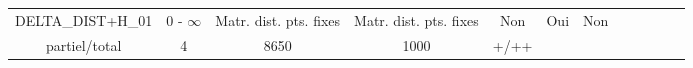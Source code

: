 \documentclass{report}
\begin{document}
\begin{landscape}
\begin{tabular}{|c|c|c|c|c|c|c|c|c|c|c|c|}
\begin{minipage}{3.3cm}\vspace{5mm}DELTA\_DIST+H\_01 \vspace{1mm} \end{minipage} &
\begin{minipage}{1.3cm}0 - $\infty$ \end{minipage} &
\begin{minipage}{1.8cm}Matr. dist. pts. fixes \end{minipage} &
\begin{minipage}{1.8cm}Matr. dist. pts. fixes \end{minipage} &
\begin{minipage}{1.4cm}Non \end{minipage} &
\begin{minipage}{1.4cm}Oui \end{minipage} &
\begin{minipage}{2cm} Non \end{minipage} &
\begin{minipage}{1.8cm}RMSE\\ partiel/total \end{minipage}&
\begin{minipage}{1.65cm} 4 \end{minipage}&
\begin{minipage}{1.2cm} 8650 \end{minipage} &
\begin{minipage}{1cm}1000 \end{minipage} &
\begin{minipage}{0.9cm}+/++ \end{minipage} \\  \hline


\end{tabular}
\end{landscape}
\end{document}
